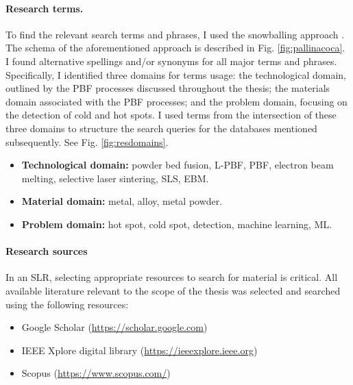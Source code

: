\paragraph{Research terms.} To find the relevant search terms and phrases, I used the snowballing approach \cite{wohlin_guidelines_2014}. The schema of the aforementioned approach is described in Fig. \ref{fig:pallinacoca}. I found alternative spellings and/or synonyms for all major terms and phrases. Specifically, I identified three domains for terms usage: the technological domain, outlined by the PBF processes discussed throughout the thesis; the materials domain associated with the PBF processes; and the problem domain, focusing on the detection of cold and hot spots. I used terms from the intersection of these three domains to structure the search queries for the databases mentioned subsequently. See Fig. \ref{fig:resdomains}.
\begin{itemize}
    \item \textbf{Technological domain:} powder bed fusion, L-PBF, PBF, electron beam melting, selective laser sintering, SLS, EBM.
    \item \textbf{Material domain:} metal, alloy, metal powder.
    \item \textbf{Problem domain:} hot spot, cold spot, detection, machine learning, ML.
\end{itemize}

\paragraph{Research sources} In an SLR, selecting appropriate resources to search for material is critical. All available literature relevant to the scope of the thesis was selected and searched using the following resources:
\begin{itemize}
    \item Google Scholar (\href{https://scholar.google.com}{https://scholar.google.com})
    \item IEEE Xplore digital library (\href{https://ieeexplore.ieee.org}{https://ieeexplore.ieee.org})
    \item Scopus (\href{https://www.scopus.com/}{https://www.scopus.com/})
\end{itemize}

